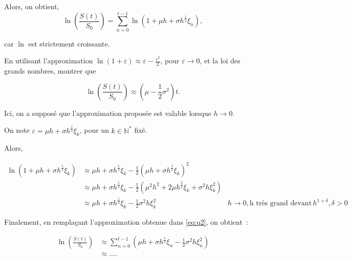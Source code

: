 \documentclass[answers, 10pt]{exam}
\begin{document}
\begin{questions}
\begin{solutionorbox}
		Alors, on obtient,
		\begin{equation}\label{eq:q2}
			\ln \left( \frac{S(t)}{S_0} \right) = \sum_{n=0}^{t-1} \ln(1 + \mu h + \sigma h^{\frac{1}{2}} \xi_n)
			,
		\end{equation}

		car $\ln$ est strictement croissante.

	\end{solutionorbox}

	\question

	En utilisant l'approximation $\ln(1 + \varepsilon) \approx \varepsilon - \frac{\varepsilon^2}{2}$, pour $\varepsilon \to 0$, et la loi des grands nombres, montrer que

	\begin{equation*}
		\ln \left(  \frac{S(t)}{S_0} \right) \approx \left( \mu - \frac{1}{2} \sigma^2 \right)t.
	\end{equation*}

	Ici, on a supposé que l'approximation proposée est valable lorsque $h\to 0$.

	\begin{solutionorbox}
		On note $\varepsilon = \mu h + \sigma h ^{\frac{1}{2}} \xi_k$,
		pour un $k\in \mathbb{N}^*$ fixé.

		Alors,

		\begin{align*}
			\ln \left( 1 + \mu h + \sigma h^{\frac{1}{2}}\xi_k \right) &\approx \mu h + \sigma h^{\frac{1}{2}} \xi_k - \frac{1}{2} \left( \mu h + \sigma h^{\frac{1}{2}}\xi_k \right)^2\\
									      &\approx \mu h + \sigma h^{\frac{1}{2}} \xi_k - \frac{1}{2} \left( \mu^2 h^2 + 2\mu h^{\frac{3}{2}} \xi_k  + \sigma^2 h \xi_k^2 \right)\\
									      &\approx \mu h + \sigma h^{\frac{1}{2}} \xi_k - \frac{1}{2} \sigma^2 h \xi_k^2 & h\to 0, \text{h très grand devant}\, h^{1 + \delta}, \delta > 0
		\end{align*}

		Finalement, en remplaçant l'approximation obtenue dans
		\cref{eq:q2}, on obtient~:

		\begin{align*}
			\ln \left(  \frac{S(t)}{S_0} \right) &\approx \sum_{n=0}^{t-1}\left(  \mu h + \sigma h^{\frac{1}{2}} \xi_n - \frac{1}{2} \sigma^2 h \xi_n^2 \right)  \\
							     &\approx \dots
			.
		\end{align*}
	\end{solutionorbox}
	


\end{questions}
\end{document}
